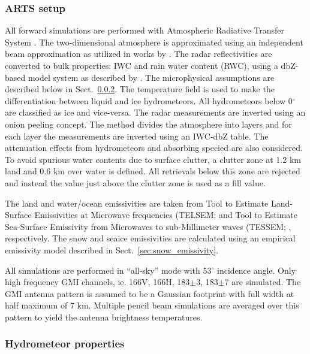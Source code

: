 \documentclass[amt, manuscript]{copernicus}
\newcommand{\todo}[1]{{\color{red} #1}}
\begin{document}
\subsubsection{ARTS setup}
\label{sec:arts_setup}
All forward simulations are performed with Atmospheric Radiative Transfer System \citep{eriksson:arts2:11}. The two-dimensional atmosphere is approximated using an independent beam approximation as utilized in works by \citet{ekelund2020using, eriksson:towar:20}. 
The radar reflectivities are converted to bulk properties: IWC and rain water content (RWC), using a dbZ-based model system as described by \citet{ekelund2020using}. The microphysical assumptions are described below in Sect.~\ref{sec:hydrometeor_prop}. The temperature field is used to make the differentiation between liquid and ice hydrometeors. All hydrometeors below 0$^{\circ}$ are classified as ice and vice-versa. The radar measurements are inverted using an onion peeling concept. The method  divides the atmosphere into layers and for each layer the measurements are inverted using an IWC-dbZ table. The attenuation effects from hydrometeors and absorbing specied are also considered. To avoid spurious water contents due to surface clutter, a clutter zone at 1.2\,\,km land and 0.6\,\,km over water is defined. All retrievals below this zone are rejected and instead the value just above the clutter zone is used as a fill value. 


The land and water/ocean emissivities are taken from Tool to Estimate Land-Surface Emissivities at Microwave frequencies (TELSEM; \citep{aires2011tool} and  Tool to Estimate Sea-Surface Emissivity from Microwaves to sub-Millimeter waves (TESSEM;
\citep{prigent2017sea}, respectively. The snow and seaice emissivities are calculated using an empirical emissivity model described in Sect.~\ref{sec:snow_emissivity}.

All simulations are performed in ``all-sky'' mode with 53$^{\circ}$ incidence angle. Only high frequency GMI channels, ie. 166V, 166H, 183$\pm$3, 183$\pm$7 are simulated. The GMI antenna pattern is assumed to be a Gaussian footprint with full width at half maximum of 7\,\,km. Multiple pencil beam simulations are averaged over this pattern to yield the antenna brightness temperatures.   

\subsubsection{Hydrometeor properties}
\label{sec:hydrometeor_prop}
\end{document}
